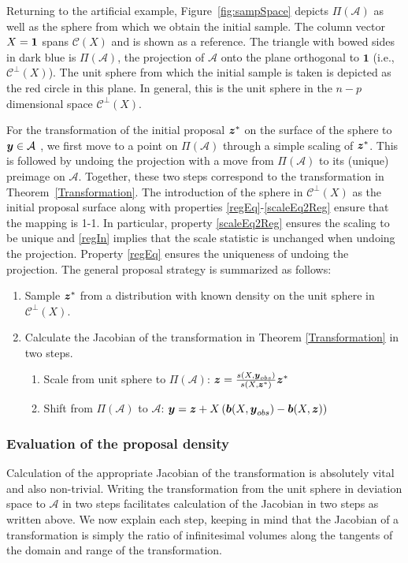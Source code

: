 \documentclass[11pt]{article}
\newcommand{\by}{\mbox{\boldmath $y$}}
\newcommand{\bz}{\mbox{\boldmath $z$}}
\newcommand{\bb}{\mbox{\boldmath $b$}}
\newcommand{\mb}{\mathbf}
\newcommand{\mc}{\mathcal}
\newcommand{\green}[1]{{\color{green}#1}}
\begin{document}
Returning to the artificial example, Figure~\ref{fig:sampSpace}
depicts $\Pi(\mathcal{A})$ as well as the sphere from which we obtain
the initial sample. The column vector $X=\bf{1}$ spans $\mc{C}(X)$ and
is shown as a reference. The triangle with bowed sides in dark
  blue is  $\Pi(\mathcal{A})$, the projection of $\mc A$ onto the
plane orthogonal to $\mb 1$ (i.e., $\mc{C}^\perp(X)$). The \green{unit} sphere from
which the initial sample is taken is depicted as the red circle in this plane.  In general, this is the unit sphere in the $n-p$ dimensional space $\mc{C}^\perp(X)$.  

For the transformation of the initial proposal $\bz^*$ on the surface of the sphere to $\by\in \mc A$ , we first move to a point on $\Pi(\mathcal{A})$ through a 
simple scaling of $\bz^*$.  This is followed by undoing the projection with a move from 
$\Pi(\mathcal{A})$ to its (unique) preimage on $\mathcal{A}$. Together, these two steps correspond to the
transformation in Theorem~\ref{Transformation}.  The introduction of
the sphere in $\mc {C}^\perp (X)$ as the initial proposal surface
along with properties \ref{regEq}-\ref{scaleEq2Reg} ensure that the mapping is
1-1. In particular, property
\ref{scaleEq2Reg} ensures the scaling to be unique and \ref{regIn}
implies that the scale statistic is unchanged when undoing the
projection. Property \ref{regEq} ensures the uniqueness of undoing the
projection.  The general proposal strategy is summarized as follows:
\begin{enumerate}
\item Sample $\bz^*$ from a distribution with known density on the unit sphere in $\mc{C}^\perp(X)$.
\item Calculate the Jacobian of \green{the} transformation in Theorem \ref{Transformation} in two steps.
\begin{enumerate}
\item Scale from unit sphere to $\Pi(\mathcal{A})$: $\bz=\frac{s(X,\boldsymbol{y}_{obs})}{s(X, \boldsymbol{z}^{*})}\bz^{*}$
\item Shift  from $\Pi(\mathcal{A})$ to $\mathcal{A}$: $\by=\bz+X\left(\bb(X, \by_{obs})-\bb(X, \bz)\right)$
\end{enumerate}
\end{enumerate}

\subsubsection{Evaluation of the proposal density} 
Calculation of the appropriate Jacobian of the transformation is absolutely vital and also non-trivial. Writing the transformation from the unit sphere in deviation space to $\mathcal{A}$ in 
two steps facilitates calculation of the Jacobian in two steps as written above. %
We now explain each step, keeping in mind that the Jacobian of a transformation is simply the ratio of infinitesimal volumes along the tangents of the domain and range of the transformation. 
\end{document}
